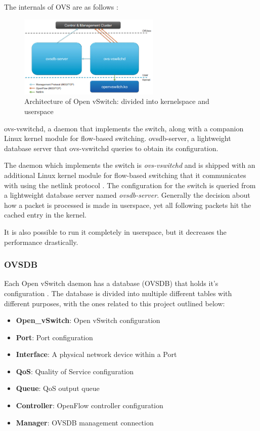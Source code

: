 The internals of OVS are as follows \cite{prognetworkingovs}:

\begin{figure}[H]
\centering
\includegraphics[width=0.6\textwidth]{images/fundamentals/openvswitch_architecture.png}
\caption{Architecture of Open vSwitch: divided into kernelspace and userspace}
\end{figure}

ovs-vswitchd, a daemon that implements the switch, along with a companion Linux kernel module for flow-based switching.
ovsdb-server, a lightweight database server that ovs-vswitchd queries to obtain its configuration.

The daemon which implements the switch is \textit{ovs-vswitchd} and is shipped with an additional Linux kernel module for flow-based switching that it communicates with using the netlink protocol \cite{ovsdeepdive}. The configuration for the switch is queried from a lightweight database server named \textit{ovsdb-server}.
Generally the decision about how a packet is processed is made in userspace, yet all following packets hit the cached entry in the kernel.

It is also possible to run it completely in userspace, but it decreases the performance drastically.


\subsubsection{OVSDB}

Each Open vSwitch daemon has a database (OVSDB) that holds it's configuration \cite{ovsdbmanual}. The database is divided into multiple different tables with different purposes, with the ones related to this project outlined below:
\begin{itemize}
\item \textbf{Open\_vSwitch}: Open vSwitch configuration
\item \textbf{Port}: Port configuration
\item \textbf{Interface}: A physical network device within a Port
\item \textbf{QoS}: Quality of Service configuration
\item \textbf{Queue}: QoS output queue
\item \textbf{Controller}: OpenFlow controller configuration
\item \textbf{Manager}: OVSDB management connection
\end{itemize}


